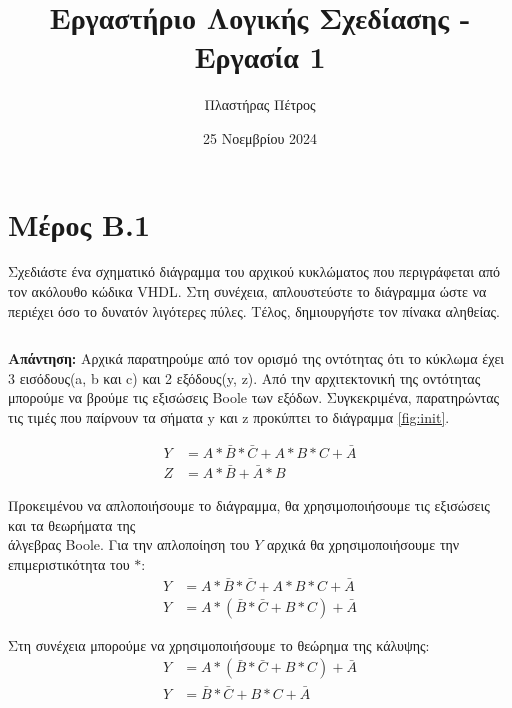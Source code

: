 \documentclass[]{article}
\begin{document}
\author{Πλαστήρας Πέτρος}
\title{Εργαστήριο Λογικής Σχεδίασης - Εργασία 1}
\date{25 Νοεμβρίου 2024}
\maketitle

\section{Μέρος Β.1}
Σχεδιάστε ένα σχηματικό διάγραμμα του αρχικού κυκλώματος που περιγράφεται από
τον ακόλουθο κώδικα VHDL. Στη συνέχεια, απλουστεύστε το διάγραμμα ώστε να
περιέχει όσο το δυνατόν λιγότερες πύλες. Τέλος, δημιουργήστε τον πίνακα αληθείας.

\inputminted{vhdl}{assign1_partB_1.vhdl}

\textbf{Απάντηση: } Αρχικά παρατηρούμε από τον ορισμό της οντότητας ότι το
κύκλωμα έχει 3 εισόδους(a, b και c) και 2 εξόδους(y, z).
Από την αρχιτεκτονική της οντότητας μπορούμε να βρούμε τις εξισώσεις Boole των εξόδων.
Συγκεκριμένα, παρατηρώντας τις τιμές που παίρνουν τα σήματα y και z προκύπτει το διάγραμμα \ref{fig:init}.

\begin{align*}
	Y & = A * \bar{B} * \bar{C} + A * B * C + \bar{A} \\
	Z & = A * \bar{B} + \bar{A} * B
\end{align*}

Προκειμένου να απλοποιήσουμε το διάγραμμα, θα χρησιμοποιήσουμε τις εξισώσεις και τα θεωρήματα της\\
άλγεβρας Boole. Για την απλοποίηση του $Y$ αρχικά θα χρησιμοποιήσουμε την επιμεριστικότητα του $*$:
\begin{align*}
	Y & = A * \bar{B} * \bar{C} + A * B * C + \bar{A} \\
	Y & = A * (\bar{B} * \bar{C} + B * C) + \bar{A}
\end{align*}

Στη συνέχεια μπορούμε να χρησιμοποιήσουμε το θεώρημα της κάλυψης:
\begin{align*}
	Y & = A * (\bar{B} * \bar{C} + B * C) + \bar{A} \\
	Y & = \bar{B} * \bar{C} + B * C + \bar{A}
\end{align*}
\end{document}
